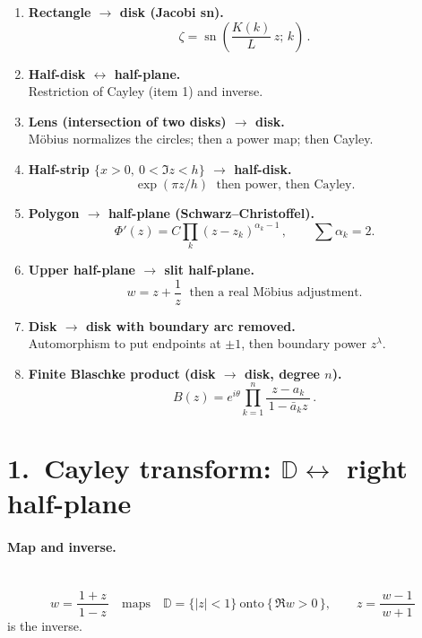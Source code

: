 \documentclass[11pt]{article}
\begin{document}
\begin{enumerate}
	\item \textbf{Rectangle $\to$ disk (Jacobi sn).}\\[2pt]
	\[
	\boxed{\,\zeta=\operatorname{sn}\!\left(\frac{K(k)}{L}\,z;\,k\right)\,}.
	\]
	
	\item \textbf{Half-disk $\leftrightarrow$ half-plane.}\\[2pt]
	Restriction of Cayley (item 1) and inverse.
	
	\item \textbf{Lens (intersection of two disks) $\to$ disk.}\\[2pt]
	Möbius normalizes the circles; then a power map; then Cayley.
	
	\item \textbf{Half-strip $\{x>0,\ 0<\Im z<h\}$ $\to$ half-disk.}\\[2pt]
	\[
	\boxed{\,\exp(\pi z/h)\,}\ \ \text{then power, then Cayley}.
	\]
	
	\item \textbf{Polygon $\to$ half-plane (Schwarz--Christoffel).}\\[2pt]
	\[
	\boxed{\,\Phi'(z)=C\prod_k (z-z_k)^{\alpha_k-1}\,},\qquad \sum\alpha_k=2.
	\]
	
	\item \textbf{Upper half-plane $\to$ slit half-plane.}\\[2pt]
	\[
	\boxed{\,w=z+\frac{1}{z}\,}\ \ \text{then a real Möbius adjustment}.
	\]
	
	\item \textbf{Disk $\to$ disk with boundary arc removed.}\\[2pt]
	Automorphism to put endpoints at $\pm1$, then boundary power $z^\lambda$.
	
	\item \textbf{Finite Blaschke product (disk $\to$ disk, degree $n$).}\\[2pt]
	\[
	\boxed{\,B(z)=e^{i\theta}\prod_{k=1}^n \frac{z-a_k}{\,1-\bar a_k z\,}\,}.
	\]
\end{enumerate}

	
	
	
\section*{1.\ Cayley transform: $\mathbb D \leftrightarrow$ right half-plane}

\paragraph{Map and inverse.}\mbox{}\\[2pt]
\[
w=\frac{1+z}{\,1-z\,}
\quad\text{maps}\quad
\mathbb D=\{|z|<1\}\ \text{onto}\ \{\,\Re w>0\,\},
\qquad
z=\frac{w-1}{\,w+1\,}
\]
is the inverse.
\end{document}
